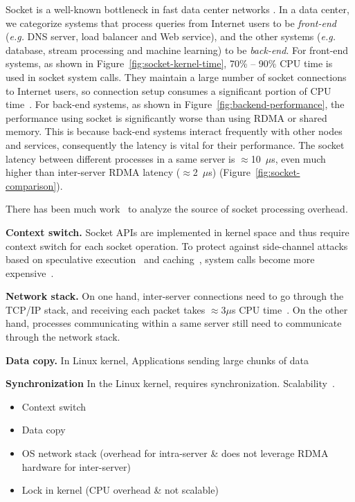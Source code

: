 Socket is a well-known bottleneck in fast data center networks . In a data center, we categorize systems that process queries from Internet users to be \textit{front-end} (\textit{e.g.} DNS server, load balancer and Web service), and the other systems (\textit{e.g.} database, stream processing and machine learning) to be \textit{back-end}.
For front-end systems, as shown in Figure~\ref{fig:socket-kernel-time}, 70\% -- 90\% CPU time is used in socket system calls. They maintain a large number of socket connections to Internet users, so connection setup consumes a significant portion of CPU time~\cite{lin2016scalable}.
For back-end systems, as shown in Figure~\ref{fig:backend-performance}, the performance using socket is significantly worse than using RDMA or shared memory. This is because back-end systems interact frequently with other nodes and services, consequently the latency is vital for their performance. The socket latency between different processes in a same server is $\approx$10~$\mu$s, even much higher than inter-server RDMA latency ($\approx$2~$\mu$s) (Figure~\ref{fig:socket-comparison}).


There has been much work~\cite{peter2016arrakis,lin2016scalable} to analyze the source of socket processing overhead.

\textbf{Context switch.}
Socket APIs are implemented in kernel space and thus require context switch for each socket operation. To protect against side-channel attacks based on speculative execution~\cite{Kocher2018spectre} and caching~\cite{Lipp2018meltdown}, system calls become more expensive~\cite{kpti}.

\textbf{Network stack.}
On one hand, inter-server connections need to go through the TCP/IP stack, and receiving each packet takes $\approx$3$\mu$s CPU time~\cite{peter2016arrakis}. On the other hand, processes communicating within a same server still need to communicate through the network stack. 

\textbf{Data copy.}
In Linux kernel, Applications sending large chunks of data 

\textbf{Synchronization}
In the Linux kernel, requires synchronization. Scalability~\cite{boyd2010analysis}.

\begin{itemize}
	\item Context switch
	\item Data copy
	\item OS network stack (overhead for intra-server \& does not leverage RDMA hardware for inter-server)
	\item Lock in kernel (CPU overhead \& not scalable)
\end{itemize}

